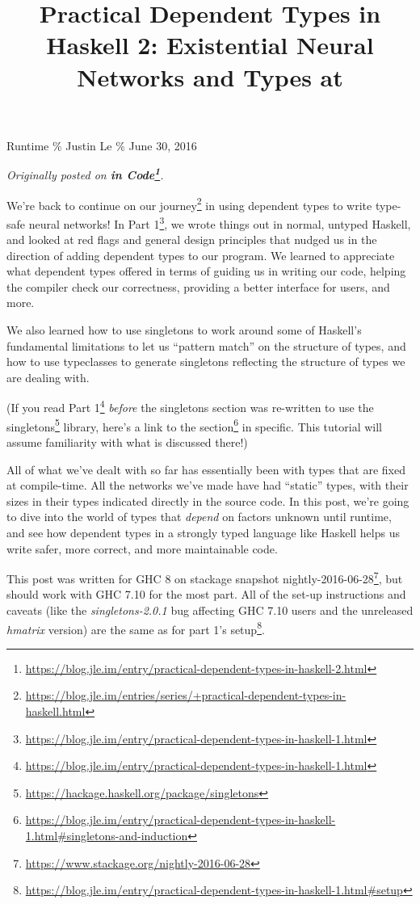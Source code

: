 \documentclass[]{article}
\title{Practical Dependent Types in Haskell 2: Existential Neural Networks and Types at}
\renewcommand{\href}[2]{#2\footnote{\url{#1}}}
\begin{document}
\maketitle

Runtime \% Justin Le \% June 30, 2016

\emph{Originally posted on
\textbf{\href{https://blog.jle.im/entry/practical-dependent-types-in-haskell-2.html}{in
Code}}.}

We're back to continue on
\href{https://blog.jle.im/entries/series/+practical-dependent-types-in-haskell.html}{our
journey} in using dependent types to write type-safe neural networks! In
\href{https://blog.jle.im/entry/practical-dependent-types-in-haskell-1.html}{Part
1}, we wrote things out in normal, untyped Haskell, and looked at red flags and
general design principles that nudged us in the direction of adding dependent
types to our program. We learned to appreciate what dependent types offered in
terms of guiding us in writing our code, helping the compiler check our
correctness, providing a better interface for users, and more.

We also learned how to use singletons to work around some of Haskell's
fundamental limitations to let us ``pattern match'' on the structure of types,
and how to use typeclasses to generate singletons reflecting the structure of
types we are dealing with.

(If you read
\href{https://blog.jle.im/entry/practical-dependent-types-in-haskell-1.html}{Part
1} \emph{before} the singletons section was re-written to use the
\href{https://hackage.haskell.org/package/singletons}{singletons} library,
\href{https://blog.jle.im/entry/practical-dependent-types-in-haskell-1.html\#singletons-and-induction}{here's
a link to the section} in specific. This tutorial will assume familiarity with
what is discussed there!)

All of what we've dealt with so far has essentially been with types that are
fixed at compile-time. All the networks we've made have had ``static'' types,
with their sizes in their types indicated directly in the source code. In this
post, we're going to dive into the world of types that \emph{depend} on factors
unknown until runtime, and see how dependent types in a strongly typed language
like Haskell helps us write safer, more correct, and more maintainable code.

This post was written for GHC 8 on stackage snapshot
\href{https://www.stackage.org/nightly-2016-06-28}{nightly-2016-06-28}, but
should work with GHC 7.10 for the most part. All of the set-up instructions and
caveats (like the \emph{singletons-2.0.1} bug affecting GHC 7.10 users and the
unreleased \emph{hmatrix} version) are the same as for
\href{https://blog.jle.im/entry/practical-dependent-types-in-haskell-1.html\#setup}{part
1's setup}.
\end{document}
